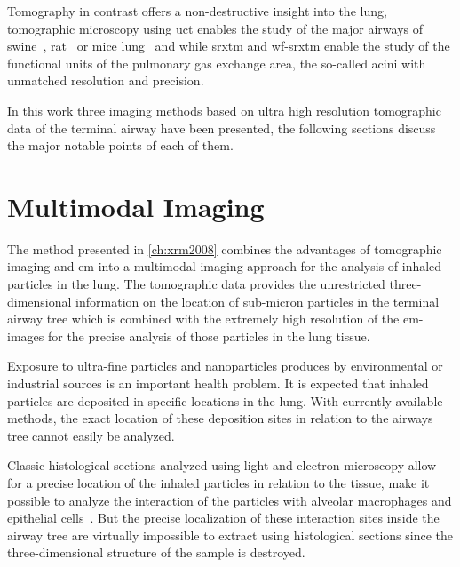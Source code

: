 Tomography in contrast offers a non-destructive insight into the lung, tomographic microscopy using \ac{uct} enables the study of the major airways of swine~\cite{Litzlbauer2006}, rat~\cite{Langheinrich2004a,Sharif2010} or mice lung~\cite{Langheinrich2004,Ritman2005} and while \ac{srxtm} and \ac{wf-srxtm} enable the study of the functional units of the pulmonary gas exchange area, the so-called acini with unmatched resolution and precision.

In this work three imaging methods based on ultra high resolution tomographic data of the terminal airway have been presented, the following sections discuss the major notable points of each of them.

\section{Multimodal Imaging}\label{sec:multimodal imaging}
The method presented in \autoref{ch:xrm2008} combines the advantages of tomographic imaging and \ac{em} into a multimodal imaging approach for the analysis of inhaled particles in the lung. The tomographic data provides the unrestricted three-dimensional information on the location of sub-micron particles in the terminal airway tree which is combined with the extremely high resolution of the \ac{em}-images for the precise analysis of those particles in the lung tissue.

Exposure to ultra-fine particles and nanoparticles produces by environmental or industrial sources is an important health problem. It is expected that inhaled particles are deposited in specific locations in the lung. With currently available methods, the exact location of these deposition sites in relation to the airways tree cannot easily be analyzed. 

Classic histological sections analyzed using light and electron microscopy allow for a precise location of the inhaled particles in relation to the tissue, \ie make it possible to analyze the interaction of the particles with alveolar macrophages and epithelial cells~\cite{Muhlfeld2008}. But the precise localization of these interaction sites inside the airway tree are virtually impossible to extract using histological sections since the three-dimensional structure of the sample is destroyed.

